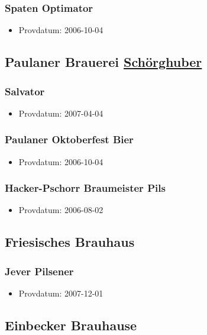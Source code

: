 \documentclass[11pt]{article}
\begin{document}
\subsubsection{Spaten Optimator}
\label{sec:org60beb7f}
\begin{itemize}
\item Provdatum: 2006-10-04
\end{itemize}
\subsection{Paulaner Brauerei \underline{Schörghuber}}
\label{sec:orge21204b}
\subsubsection{Salvator}
\label{sec:org04b444b}
\begin{itemize}
\item Provdatum: 2007-04-04
\end{itemize}
\subsubsection{Paulaner Oktoberfest Bier}
\label{sec:org9c25b92}
\begin{itemize}
\item Provdatum: 2006-10-04
\end{itemize}
\subsubsection{Hacker-Pschorr Braumeister Pils}
\label{sec:org8f743dd}
\begin{itemize}
\item Provdatum: 2006-08-02
\end{itemize}
\subsection{Friesisches Brauhaus}
\label{sec:org9d19958}
\subsubsection{Jever Pilsener}
\label{sec:orge2fdfa3}
\begin{itemize}
\item Provdatum: 2007-12-01
\end{itemize}
\subsection{Einbecker Brauhause}
\label{sec:org833ba72}
\end{document}
